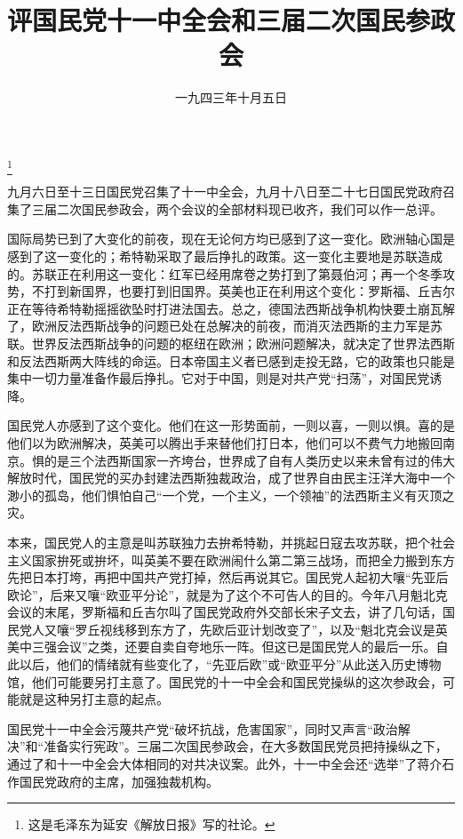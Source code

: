 
\title{评国民党十一中全会和三届二次国民参政会}
\date{一九四三年十月五日}
\thanks{这是毛泽东为延安《解放日报》写的社论。}
\maketitle


九月六日至十三日国民党召集了十一中全会，九月十八日至二十七日国民党政府召集了三届二次国民参政会，两个会议的全部材料现已收齐，我们可以作一总评。

国际局势已到了大变化的前夜，现在无论何方均已感到了这一变化。欧洲轴心国是感到了这一变化的；希特勒采取了最后挣扎的政策。这一变化主要地是苏联造成的。苏联正在利用这一变化：红军已经用席卷之势打到了第聂伯河；再一个冬季攻势，不打到新国界，也要打到旧国界。英美也正在利用这个变化：罗斯福、丘吉尔正在等待希特勒摇摇欲坠时打进法国去。总之，德国法西斯战争机构快要土崩瓦解了，欧洲反法西斯战争的问题已处在总解决的前夜，而消灭法西斯的主力军是苏联。世界反法西斯战争的问题的枢纽在欧洲；欧洲问题解决，就决定了世界法西斯和反法西斯两大阵线的命运。日本帝国主义者已感到走投无路，它的政策也只能是集中一切力量准备作最后挣扎。它对于中国，则是对共产党“扫荡”，对国民党诱降。

国民党人亦感到了这个变化。他们在这一形势面前，一则以喜，一则以惧。喜的是他们以为欧洲解决，英美可以腾出手来替他们打日本，他们可以不费气力地搬回南京。惧的是三个法西斯国家一齐垮台，世界成了自有人类历史以来未曾有过的伟大解放时代，国民党的买办封建法西斯独裁政治，成了世界自由民主汪洋大海中一个渺小的孤岛，他们惧怕自己“一个党，一个主义，一个领袖”的法西斯主义有灭顶之灾。

本来，国民党人的主意是叫苏联独力去拚希特勒，并挑起日寇去攻苏联，把个社会主义国家拚死或拚坏，叫英美不要在欧洲闹什么第二第三战场，而把全力搬到东方先把日本打垮，再把中国共产党打掉，然后再说其它。国民党人起初大嚷“先亚后欧论”，后来又嚷“欧亚平分论”，就是为了这个不可告人的目的。今年八月魁北克会议的末尾，罗斯福和丘吉尔叫了国民党政府外交部长宋子文去，讲了几句话，国民党人又嚷“罗丘视线移到东方了，先欧后亚计划改变了”，以及“魁北克会议是英美中三强会议”之类，还要自卖自夸地乐一阵。但这已是国民党人的最后一乐。自此以后，他们的情绪就有些变化了，“先亚后欧”或“欧亚平分”从此送入历史博物馆，他们可能要另打主意了。国民党的十一中全会和国民党操纵的这次参政会，可能就是这种另打主意的起点。

国民党十一中全会污蔑共产党“破坏抗战，危害国家”，同时又声言“政治解决”和“准备实行宪政”。三届二次国民参政会，在大多数国民党员把持操纵之下，通过了和十一中全会大体相同的对共决议案。此外，十一中全会还“选举”了蒋介石作国民党政府的主席，加强独裁机构。

